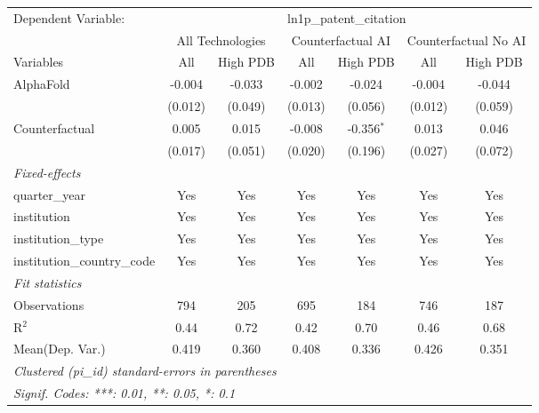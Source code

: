 \begingroup
\centering
\begin{tabular}{lcccccc}
   \tabularnewline \midrule \midrule
   Dependent Variable: & \multicolumn{6}{c}{ln1p\_patent\_citation}\\
 & \multicolumn{2}{c}{All Technologies} & \multicolumn{2}{c}{Counterfactual AI} & \multicolumn{2}{c}{Counterfactual No AI} \\
\cmidrule(lr){1-1}\cmidrule(lr){2-3} \cmidrule(lr){4-5} \cmidrule(lr){6-7}
Variables & \multicolumn{1}{c}{All} & \multicolumn{1}{c}{High PDB} & \multicolumn{1}{c}{All} & \multicolumn{1}{c}{High PDB} & \multicolumn{1}{c}{All} & \multicolumn{1}{c}{High PDB} \\
\cmidrule(lr){1-1}\cmidrule(lr){2-2} \cmidrule(lr){3-3} \cmidrule(lr){4-4} \cmidrule(lr){5-5} \cmidrule(lr){6-6} \cmidrule(lr){7-7}
   AlphaFold                    & -0.004  & -0.033  & -0.002  & -0.024       & -0.004  & -0.044\\   
                                & (0.012) & (0.049) & (0.013) & (0.056)      & (0.012) & (0.059)\\   
   Counterfactual               & 0.005   & 0.015   & -0.008  & -0.356$^{*}$ & 0.013   & 0.046\\   
                                & (0.017) & (0.051) & (0.020) & (0.196)      & (0.027) & (0.072)\\   
   \midrule
   \emph{Fixed-effects}\\
   quarter\_year                & Yes     & Yes     & Yes     & Yes          & Yes     & Yes\\  
   institution                  & Yes     & Yes     & Yes     & Yes          & Yes     & Yes\\  
   institution\_type            & Yes     & Yes     & Yes     & Yes          & Yes     & Yes\\  
   institution\_country\_code   & Yes     & Yes     & Yes     & Yes          & Yes     & Yes\\  
   \midrule
   \emph{Fit statistics}\\
   Observations                 & 794     & 205     & 695     & 184          & 746     & 187\\  
   R$^2$                        & 0.44    & 0.72    & 0.42    & 0.70         & 0.46    & 0.68\\  
Mean(Dep. Var.) & 0.419 & 0.360 & 0.408 & 0.336 & 0.426 & 0.351 \\
   \midrule \midrule
   \multicolumn{7}{l}{\emph{Clustered (pi\_id) standard-errors in parentheses}}\\
   \multicolumn{7}{l}{\emph{Signif. Codes: ***: 0.01, **: 0.05, *: 0.1}}\\
\end{tabular}
\par\endgroup
